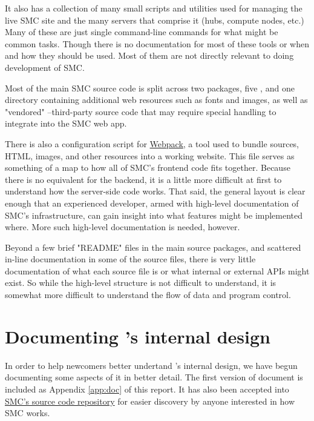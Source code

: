 \documentclass{deliverablereport}
\begin{document}
It also has a collection of many small scripts and utilities used for managing
the live SMC site and the many servers that comprise it (hubs, compute nodes,
etc.)  Many of these are just single command-line commands for what might be
common tasks.  Though there is no documentation for most of these tools or when
and how they should be used.  Most of them are not directly relevant to
doing development of SMC.

Most of the main SMC source code is split across two \Python packages, five
\JavaScript, and one directory containing additional web resources such as
fonts and images, as well as "vendored" \JavaScript--third-party source code
that may require special handling to integrate into the SMC web app.

There is also a configuration script for \href{https://webpack.github.io/}{Webpack},
a tool used to bundle \JavaScript sources, HTML, images, and other resources
into a working website.  This file serves as something of a map to how all of
SMC's frontend code fits together.  Because there is no equivalent for the
backend, it is a little more difficult at first to understand how the
server-side code works.  That said, the general layout is clear enough that an
experienced developer, armed with high-level documentation of SMC's
infrastructure, can gain insight into what features might be implemented where.
More such high-level documentation is needed, however.

Beyond a few brief "README" files in the main source packages, and scattered
in-line documentation in some of the source files, there is very little
documentation of what each source file is or what internal or external APIs
might exist.  So while the high-level structure is not difficult to understand,
it is somewhat more difficult to understand the flow of data and program
control.

\section{Documenting \SMC's internal design}

In order to help newcomers better undertand \SMC's internal design, we have
begun documenting some aspects of it in better detail.  The first version of
document is included as Appendix \ref{app:doc} of this report. It has also been
accepted into
\href{https://github.com/sagemathinc/smc/blob/master/src/doc/design_overview/overview.rst}{SMC's
source code repository} for easier discovery by anyone interested in how SMC
works.
\end{document}
